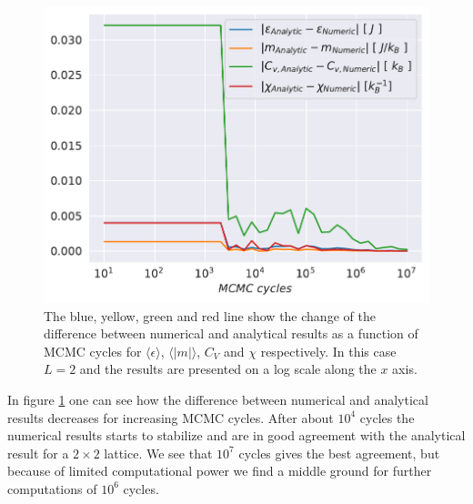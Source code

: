 \documentclass[english,notitlepage,reprint,nofootinbib]{revtex4-1}  %
\begin{document}
\begin{figure}[H]
    \centering
    \includegraphics[width=.5\textwidth]{../figures/numeric_analytic.pdf}
    \caption{The blue, yellow, green and red line show the change of the difference between numerical and analytical results as a function of MCMC cycles for $\langle \epsilon \rangle$, $\langle |m| \rangle$, $C_V$ and $\chi$ respectively. In this case $L=2$ and the results are presented on a log scale along the $x$ axis.}
    \label{fig:numeric_analytic}
\end{figure}
In figure \ref{fig:numeric_analytic} one can see how the difference between numerical and analytical results decreases for increasing MCMC cycles. After about $10^{4}$ cycles the numerical results starts to stabilize and are in good agreement with the analytical result for a $2 \times 2$ lattice. We see that $10^7$ cycles gives the best agreement, but because of limited computational power we find a middle ground for further computations of $10^6$ cycles.
\end{document}
